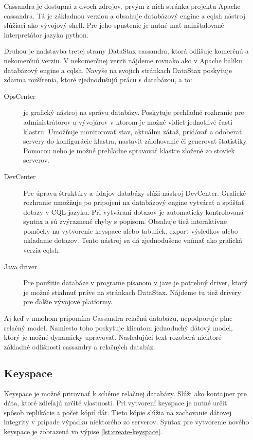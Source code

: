 	Cassandra je dostupná z dvoch zdrojov, prvým z nich stránka projektu Apache cassandra. Tá je základnou verziou a obsahuje databázový engine a cqlsh nástroj slúžiaci ako vývojový shell. Pre jeho spustenie je nutné mať nainštalované interpretátor jazyka python.
	
	Druhou je nadstavba tretej strany DataStax cassandra, ktorá odlišuje komerčnú a nekomerčnú verziu. V nekomerčnej verzii nájdeme rovnako ako v Apache balíku databázový engine a cqlsh. Navyše na svojich stránkach DataStax poskytuje zdarma rozšírenia, ktoré zjednodušujú prácu s databázou, a to:
	
	\begin{description}
		\item[OpsCenter] je grafický nástroj na správu databázy. Poskytuje prehľadné rozhranie pre administrátorov a vývojárov v ktorom je možné vidieť jednotlivé časti klastru. Umožňuje monitorovať stav, aktuálnu zátaž, pridávať a odoberať servery do konfigurácie klastra, nastaviť zálohovanie či generovať štatistiky. Pomocou neho je možné prehľadne spravovať klastre zložené zo stoviek serverov.

		\item[DevCenter] Pre úpravu štruktúry a údajov databázy slúži nástroj DevCenter. Grafické rozhranie umožňuje po pripojení na databázový engine vytvárať a spúšťať dotazy v CQL jazyku. Pri vytváraní dotazov je automaticky kontrolovaná syntax a sú zvýraznené chyby s popisom. 
		Obsahuje tiež interaktívne pomôcky na vytvorenie keyspace alebo tabuliek, export výsledkov alebo ukladanie dotazov.
		Tento nástroj sa dá zjednodušene vnímať ako grafická verzia cqlsh.

		\item[Java driver] Pre použitie databáze v programe písanom v jave je potrebný driver, ktorý je možné stiahnuť práve na stránkach DataStax. Nájdeme tu tiež drivery pre ďalšie vývojové platformy.
	\end{description}
	
	Aj keď v mnohom pripomína Cassandra relačnú databázu, nepodporuje plne relačný model. Namiesto toho poskytuje klientom jednoduchý dátový model, ktorý je možné dynamicky upravovať. Nasledujúci text rozoberá niektoré základné odlišnosti cassandry a relačných databáz.
	\subsection{Keyspace}
	Keyspace je možné prirovnať k schéme relačnej databázy. Slúži ako kontajner pre dáta, ktoré zdieľajú určité vlastnosti. Pri vytvorení keyspace je nutné určiť spôsob replikácie a počet kópií dát. Tieto kópie slúžia na zachovanie dátovej integrity v prípade výpadku niektorého zo serverov. Syntax pre vytvorenie nového keyspace je zobrazená vo výpise \ref{lst:create-keyspace}.

